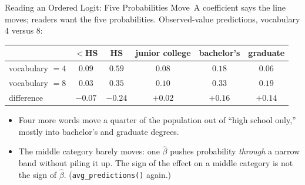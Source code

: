 \documentclass[aspectratio=169,11pt,xcolor=dvipsnames]{beamer}
\newcommand{\core}{\,\raisebox{0.6pt}{\textcolor{corestar}{$\bigstar$}}}
\begin{document}
\begin{frame}{Reading an Ordered Logit: Five Probabilities Move\core}
A coefficient says the line moves; readers want the five probabilities.
Observed-value predictions, vocabulary $4$ versus $8$:
\begin{center}\small
\renewcommand{\arraystretch}{1.05}
\begin{tabular}{lccccc}
\toprule
 & $<$HS & HS & junior college & bachelor's & graduate \\
\midrule
vocabulary $= 4$ & $0.09$ & $0.59$ & $0.08$ & $0.18$ & $0.06$ \\
vocabulary $= 8$ & $0.03$ & $0.35$ & $0.10$ & $0.33$ & $0.19$ \\
\midrule
difference & $-0.07$ & $-0.24$ & $+0.02$ & $+0.16$ & $+0.14$ \\
\bottomrule
\end{tabular}
\end{center}
\vskip3pt
\begin{itemize}\itemsep2pt
  \item Four more words move a quarter of the population out of ``high
        school only,'' mostly into bachelor's and graduate degrees.
  \item The middle category barely moves: one $\hat\beta$ pushes
        probability \emph{through} a narrow band without piling it up. The
        sign of the effect on a middle category is not the sign of
        $\hat\beta$. (\texttt{avg\_predictions()} again.)
\end{itemize}
\end{frame}
\end{document}
